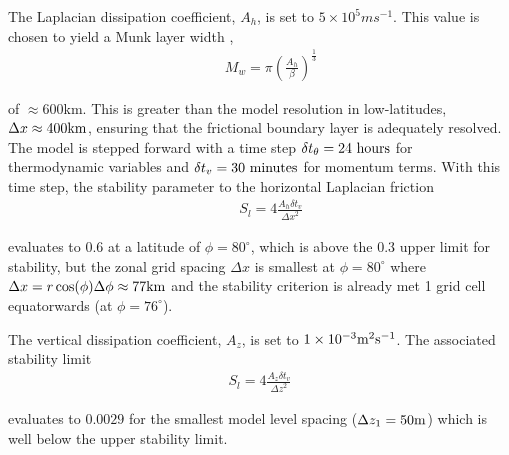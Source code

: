 The Laplacian dissipation coefficient, $A_{h}$, is set to $5 \times 10^5 m s^{-1}$.
This value is chosen to yield a Munk layer width \citep{adcroft:95},
\begin{eqnarray}
\label{eq:eg-global-munk_layer}
&& M_{w} = \pi ( \frac { A_{h} }{ \beta } )^{\frac{1}{3}}
\end{eqnarray}

\noindent  of $\approx 600$km. This is greater than the model
resolution in low-latitudes, $\Delta x \approx 400{\rm km}$, ensuring that the frictional 
boundary layer is adequately resolved.
\\

\noindent The model is stepped forward with a time step $\delta
t_{\theta}=24~{\rm hours}$ for thermodynamic variables and $\delta
t_{v}=30~{\rm minutes}$ for momentum terms. With this time step, the
stability parameter to the horizontal Laplacian friction
\citep{adcroft:95}
\begin{eqnarray}
\label{eq:eg-global-laplacian_stability}
&& S_{l} = 4 \frac{A_{h} \delta t_{v}}{{\Delta x}^2}
\end{eqnarray}

\noindent evaluates to 0.6 at a latitude of $\phi=80^{\circ}$, which
is above the 0.3 upper limit for stability, but the zonal grid spacing
$\Delta x$ is smallest at $\phi=80^{\circ}$ where $\Delta
x=r\cos(\phi)\Delta \phi\approx 77{\rm km}$ and the stability
criterion is already met 1 grid cell equatorwards (at $\phi=76^{\circ}$).


\noindent The vertical dissipation coefficient, $A_{z}$, is set to 
$1\times10^{-3} {\rm m}^2{\rm s}^{-1}$. The associated stability limit
\begin{eqnarray}
\label{eq:eg-global-laplacian_stability_z}
S_{l} = 4 \frac{A_{z} \delta t_{v}}{{\Delta z}^2}
\end{eqnarray}

\noindent evaluates to $0.0029$ for the smallest model
level spacing ($\Delta z_{1}=50{\rm m}$) which is well below
the upper stability limit.
\\


